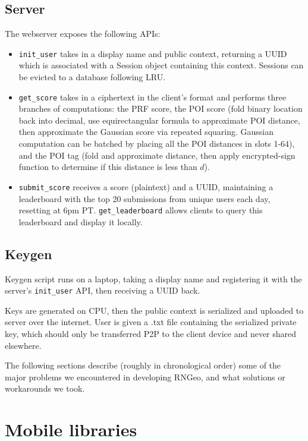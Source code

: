 \documentclass{article}
\begin{document}
\subsection{Server}
The webserver exposes the following APIs:
\begin{itemize}
    \item \verb|init_user| takes in a display name and public context, returning a UUID which is associated with a Session object containing this context. Sessions can be evicted to a database following LRU. 
    \item \verb|get_score| takes in a ciphertext in the client's format and performs three branches of computations: the PRF score, the POI score (fold binary location back into decimal, use equirectangular formula to approximate POI distance, then approximate the Gaussian score via repeated squaring. Gaussian computation can be batched by placing all the POI distances in slots 1-64), and the POI tag (fold and approximate distance, then apply encrypted-sign function to determine if this distance is less than $d$).
    \item \verb|submit_score| receives a score (plaintext) and a UUID, maintaining a leaderboard with the top 20 submissions from unique users each day, resetting at 6pm PT. \verb|get_leaderboard| allows clients to query this leaderboard and display it locally.
\end{itemize}

\subsection{Keygen}
Keygen script runs on a laptop, taking a display name and registering it with the server's \verb|init_user| API, then receiving a UUID back.

Keys are generated on CPU, then the public context is serialized and uploaded to server over the internet. 
User is given a .txt file containing the serialized private key, which should only be transferred P2P to the client device and never shared elsewhere.

\vspace{1cm}

The following sections describe (roughly in chronological order) some of the major problems we encountered in developing RNGeo, and what solutions or workarounds we took.

\section{Mobile libraries}
\end{document}
